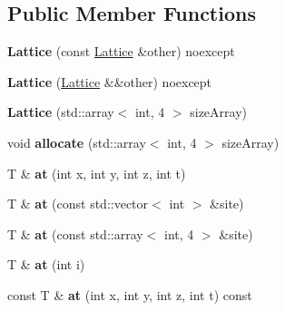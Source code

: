 \subsection*{Public Member Functions}
\begin{DoxyCompactItemize}
\item 
{\bfseries Lattice} (const \hyperlink{classLattice}{Lattice} \&other) noexcept\hypertarget{classLattice_a329f8bb4934a16dde20245e5aed1e0f2}{}\label{classLattice_a329f8bb4934a16dde20245e5aed1e0f2}

\item 
{\bfseries Lattice} (\hyperlink{classLattice}{Lattice} \&\&other) noexcept\hypertarget{classLattice_ac515062dd08174cfd300cb7ae82c1131}{}\label{classLattice_ac515062dd08174cfd300cb7ae82c1131}

\item 
{\bfseries Lattice} (std\+::array$<$ int, 4 $>$ size\+Array)\hypertarget{classLattice_a9583bced9172a01d6abb839dc1bea8a4}{}\label{classLattice_a9583bced9172a01d6abb839dc1bea8a4}

\item 
void {\bfseries allocate} (std\+::array$<$ int, 4 $>$ size\+Array)\hypertarget{classLattice_a34d4aba6e3440624d7a78f3de5604bbe}{}\label{classLattice_a34d4aba6e3440624d7a78f3de5604bbe}

\item 
T \& {\bfseries at} (int x, int y, int z, int t)\hypertarget{classLattice_a9345ef22de8cd40304ffaa24bbf84e57}{}\label{classLattice_a9345ef22de8cd40304ffaa24bbf84e57}

\item 
T \& {\bfseries at} (const std\+::vector$<$ int $>$ \&site)\hypertarget{classLattice_a505c50837cfcda18a1f26837ba487d1b}{}\label{classLattice_a505c50837cfcda18a1f26837ba487d1b}

\item 
T \& {\bfseries at} (const std\+::array$<$ int, 4 $>$ \&site)\hypertarget{classLattice_a2885da42d927704c9a465f31d4809302}{}\label{classLattice_a2885da42d927704c9a465f31d4809302}

\item 
T \& {\bfseries at} (int i)\hypertarget{classLattice_a7edbcfba94b2c85c8a73eef6c8b4969c}{}\label{classLattice_a7edbcfba94b2c85c8a73eef6c8b4969c}

\item 
const T \& {\bfseries at} (int x, int y, int z, int t) const \hypertarget{classLattice_a0f68df177d44035f352c097dc59d7b69}{}\label{classLattice_a0f68df177d44035f352c097dc59d7b69}


\end{DoxyCompactItemize}
